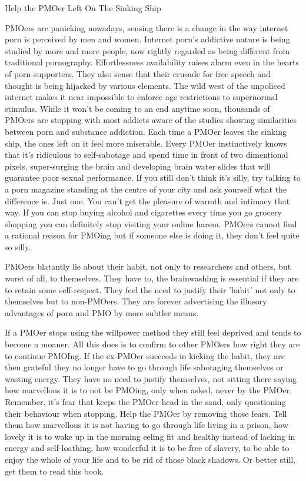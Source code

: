 Help the PMOer Left On The Sinking Ship

PMOers are panicking nowadays, sensing there is a change in the way internet porn is perceived by men and women. Internet porn's addictive nature is being studied by more and more people, now rightly regarded as being different from traditional pornography. Effortlessness availability raises alarm even in the hearts of porn supporters. They also sense that their crusade for free speech and thought is being hijacked by various elements. The wild west of the unpoliced internet makes it near impossible to enforce age restrictions to supernormal stimulus. While it won't be coming to an end anytime soon, thousands of PMOers are stopping with most addicts aware of the studies showing similarities between porn and substance addiction. Each time a PMOer leaves the sinking ship, the ones left on it feel more miserable. Every PMOer instinctively knows that it's ridiculous to self-sabotage and spend time in front of two dimentional pixels, super-surging the brain and developing brain water slides that will guarantee poor sexual performance. If you still don't think it's silly, try talking to a porn magazine standing at the centre of your city and ask yourself what the difference is. Just one. You can't get the pleasure of warmth and intimacy that way. If you can stop buying alcohol and cigarettes every time you go grocery shopping you can definitely stop visiting your online harem. PMOers cannot find a rational reason for PMOing but if someone else is doing it, they don't feel quite so silly.

PMOers blatantly lie about their habit, not only to researchers and others, but worst of all, to themselves. They have to, the brainwashing is essential if they are to retain some self-respect. They feel the need to justify their 'habit' not only to themselves but to non-PMOers. They are forever advertising the illusory advantages of porn and PMO by more subtler means.

If a PMOer stops using the willpower method they still feel deprived and tends to become a moaner. All this does is to confirm to other PMOers how right they are to continue PMOIng. If the ex-PMOer succeeds in kicking the habit, they are then grateful they no longer have to go through life sabotaging themselves or wasting energy. They have no need to justify themselves, not sitting there saying how marvellous it is to not be PMOing, only when asked, never by the PMOer. Remember, it's fear that keeps the PMOer head in the sand, only questioning their behaviour when stopping. Help the PMOer by removing those fears. Tell them how marvellous it is not having to go through life living in a prison, how lovely it is to wake up in the morning eeling fit and healthy instead of lacking in energy and self-loathing, how wonderful it is to be free of slavery, to be able to enjoy the whole of your life and to be rid of those black shadows. Or better still, get them to read this book.

